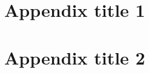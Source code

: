 \documentclass[final,5p,times,twocolumn,authoryear]{elsarticle}
\begin{document}
\section{Appendix title 1}

\section{Appendix title 2}









\end{document}

